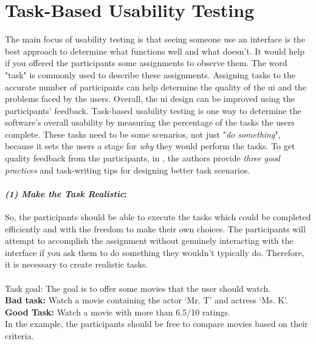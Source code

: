 \clearpage
\section{Task-Based Usability Testing}
\label{background:section:task}
The main focus of usability testing is that seeing someone use an interface is the best approach to determine what functions well and what doesn't. 
It would help if you offered the participants some assignments to observe them. 
The word "task" is commonly used to describe these assignments.
Assigning tasks to the accurate number of participants can help determine the quality of the \ac{ui} and the problems faced by the users. 
Overall, the \ac{ui} design can be improved using the participants' feedback. 
Task-based usability testing is one way to determine the software's overall usability \cite{article:usability:doesburg} by measuring the percentage of the tasks the users complete.
These tasks need to be some scenarios, not just "\textit{do something}", because it sets the users a stage for \textit{why} they would perform the tasks. 
To get quality feedback from the participants, in \cite{misc:usability:tasks}, the authors provide \textit{three good practices} and task-writing tips for designing better task scenarios.

\paragraph{\textit{(1) Make the Task Realistic}:}
So, the participants should be able to execute the tasks which could be completed efficiently and with the freedom to make their own choices.
The participants will attempt to accomplish the assignment without genuinely interacting with the interface if you ask them to do something they wouldn't typically do. 
Therefore, it is necessary to create realistic tasks. \\\\
Task goal: The goal is to offer some movies that the user should watch. \\
\textbf{Bad task: } Watch a movie containing the actor `Mr. T' and actress `Ms. K'. \\
\textbf{Good Task: } Watch a movie with more than 6.5/10 ratings. \\
In the example, the participants should be free to compare movies based on their criteria. 

